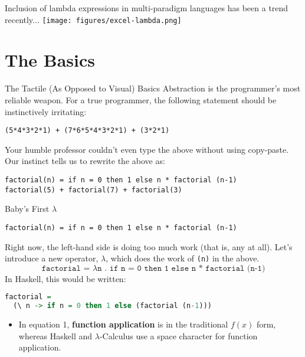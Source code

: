 \documentclass[11pt]{beamer}
\begin{document}
\begin{frame}[fragile=singleslide]{}
\begin{center}
Inclusion of lambda expressions in multi-paradigm languages has been a trend recently...
\texttt{[image: figures/excel-lambda.png]}
\end{center}
\end{frame}

\section[Basics]{The Basics}
\begin{frame}[fragile=singleslide]{The Tactile (As Opposed to Visual) Basics}
Abstraction is the programmer's most reliable weapon.  For a true programmer, the following statement should be instinctively irritating:
\begin{lstlisting}[style=C]
(5*4*3*2*1) + (7*6*5*4*3*2*1) + (3*2*1)
\end{lstlisting}
Your humble professor couldn't even type the above without using copy-paste.  Our instinct tells us to rewrite the above as:
\begin{lstlisting}[style=C]
factorial(n) = if n = 0 then 1 else n * factorial (n-1) 
factorial(5) + factorial(7) + factorial(3)
\end{lstlisting}
\end{frame}

\begin{frame}[fragile=singleslide]{Baby's First $\lambda$}
\begin{lstlisting}[style=C]
factorial(n) = if n = 0 then 1 else n * factorial (n-1) 
\end{lstlisting}
Right now, the left-hand side is doing too much work (that is, any at all).  Let's introduce a new operator, $\lambda$, which does the work of \texttt{(n)} in the above.
{\small
\begin{equation}
\texttt{factorial = } \lambda \texttt{n . if n = 0 then 1 else n * factorial (n-1)}
\end{equation}}
In Haskell, this would be written:
\begin{lstlisting}[style=C, language=Haskell]
factorial = 
  (\ n -> if n = 0 then 1 else (factorial (n-1)))
\end{lstlisting}
\begin{itemize}
\item In equation 1, \textbf{function application} is in the traditional $f(x)$ form, whereas Haskell and $\lambda$-Calculus use a space character for function application.
\end{itemize}
\end{frame}
\end{document}
